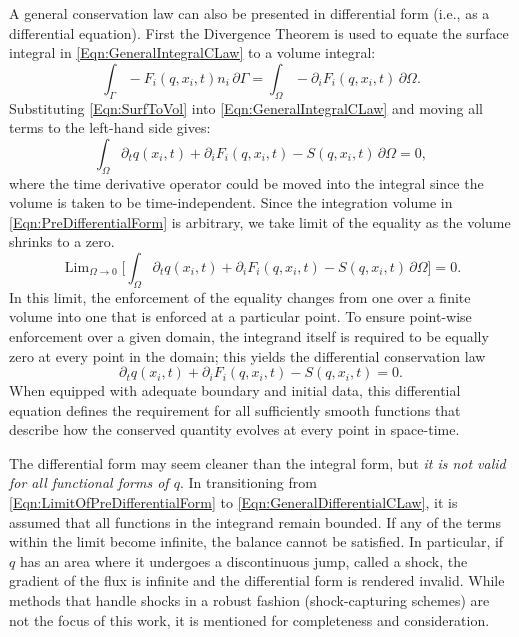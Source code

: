 \documentclass[Prelim,12pt]{WisconsinThesis}
\newcommand{\pdt}   {\partial_t}
\newcommand{\pdi}   {\partial_i}
\newcommand{\V}     {\ensuremath{\Omega}}
\newcommand{\dV}    {\,\partial\V}
\newcommand{\IntV}  {\int_{\V}}
\renewcommand{\S}   {\ensuremath{\Gamma}}
\newcommand{\dS}    {\,\partial\S}
\newcommand{\IntS}  {\int_{\S}}
\newcommand{\q}     {\ensuremath{q}}
\DeclareMathOperator*{\Lim}{Lim}
\begin{document}
A general conservation law can also be presented in differential form (i.e., as a differential equation).
First the Divergence Theorem is used to equate the surface integral in \cref{Eqn:GeneralIntegralCLaw} to a volume integral:
\begin{equation}
    \IntS -F_i(\q,x_i,t) n_i\dS = \IntV - \pdi F_i(\q,x_i,t) \dV.
    \label{Eqn:SurfToVol}
\end{equation}
Substituting \cref{Eqn:SurfToVol} into \cref{Eqn:GeneralIntegralCLaw} and moving all terms to the left-hand side gives:
\begin{equation}%
    \IntV \pdt\q(x_i,t) + \pdi F_i(\q,x_i,t) - S(\q,x_i,t) \dV = 0,
    \label{Eqn:PreDifferentialForm}
\end{equation}
where the time derivative operator could be moved into the integral since the volume is taken to be time-independent.
Since the integration volume in \cref{Eqn:PreDifferentialForm} is arbitrary, we take limit of the equality as the volume shrinks to a zero.
\begin{equation}%
    \Lim_{\V \rightarrow 0}\Biggl[\IntV \pdt\q(x_i,t) + \pdi F_i(\q,x_i,t) - S(\q,x_i,t) \dV \Biggr]= 0.
    \label{Eqn:LimitOfPreDifferentialForm}
\end{equation}
In this limit, the enforcement of the equality changes from one over a finite volume into one that is enforced at a particular point.
To ensure point-wise enforcement over a given domain, the integrand itself is required to be equally zero at every point in the domain; this yields the differential conservation law
\begin{equation}
    \pdt\q(x_i,t) + \pdi F_i(\q,x_i,t) - S(\q,x_i,t) = 0.
    \label{Eqn:GeneralDifferentialCLaw}
\end{equation}
When equipped with adequate boundary and initial data, this differential equation defines the requirement for all sufficiently smooth functions that describe how the conserved quantity evolves at every point in space-time.

The differential form may seem cleaner than the integral form, but \emph{it is not valid for all functional forms of \q{}}.
In transitioning from \cref{Eqn:LimitOfPreDifferentialForm} to \cref{Eqn:GeneralDifferentialCLaw}, it is assumed that all functions in the integrand remain bounded.
If any of the terms within the limit become infinite, the balance cannot be satisfied.
In particular, if \q{} has an area where it undergoes a discontinuous jump, called a shock, the gradient of the flux is infinite and the differential form is rendered invalid.
While methods that handle shocks in a robust fashion (shock-capturing schemes) are not the focus of this work, it is mentioned for completeness and consideration.
\end{document}
